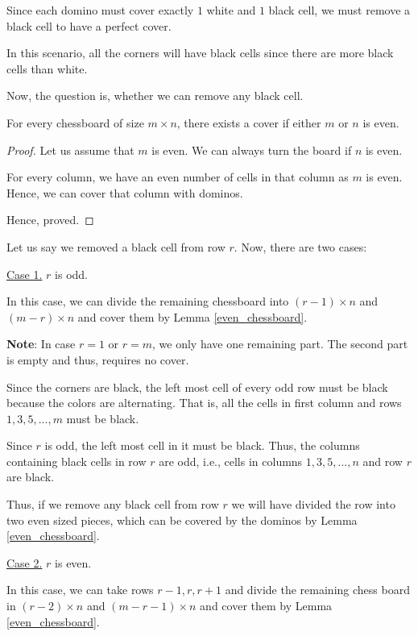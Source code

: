 	Since each domino must cover exactly $1$ white and $1$ black cell, we must remove a black cell to have a perfect cover.

	In this scenario, all the corners will have black cells since there are more black cells than white.

	Now, the question is, whether we can remove any black cell. 

	\begin{lemma}\label{even_chessboard}
		For every chessboard of size $m \times n$, there exists a cover if either $m$ or $n$ is even.
	\end{lemma}

	\begin{proof}
		Let us assume that $m$ is even. We can always turn the board if $n$ is even.

		For every column, we have an even number of cells in that column as $m$ is even. Hence, we can cover that column with dominos.

		Hence, proved.
	\end{proof}


	Let us say we removed a black cell from row $r$. Now, there are two cases:
	\bigbreak

	\underline{Case 1.} $r$ is odd.

	In this case, we can divide the remaining chessboard into $(r-1) \times n$ and $(m-r) \times n$ and cover them by Lemma \ref{even_chessboard}.
	
	\textbf{Note}: In case $r = 1$ or $r = m$, we only have one remaining part. The second part is empty and thus, requires no cover.
	
	Since the corners are black, the left most cell of every odd row must be black because the colors are alternating. That is, all the cells in first column and rows $1, 3, 5, ..., m$ must be black.

	Since $r$ is odd, the left most cell in it must be black.
	Thus, the columns containing black cells in row $r$ are odd, i.e., cells in columns $1, 3, 5, ..., n$ and row $r$ are black.

	Thus, if we remove any black cell from row $r$
	we will have divided the row into two even sized pieces, 
	which can be covered by the dominos by Lemma \ref{even_chessboard}.

	\bigbreak
	\underline{Case 2.} $r$ is even.

	In this case, we can take rows $r-1, r, r+1$ 
	and divide the remaining chess board in $(r-2) \times n$ and $(m-r-1) \times n$ 
	and cover them by Lemma \ref{even_chessboard}.

